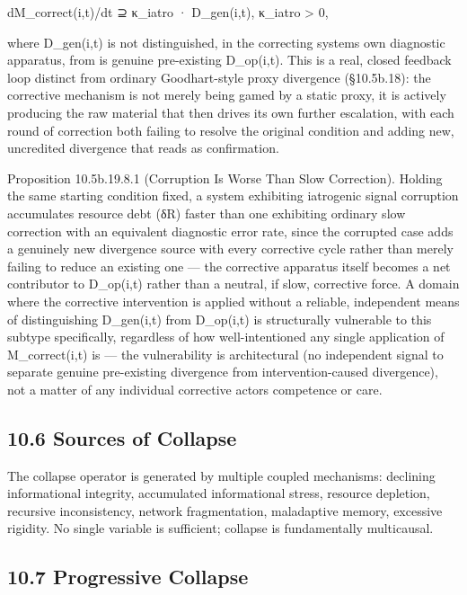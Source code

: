 \documentclass[
]{article}
\begin{document}
dM\_correct(i,t)/dt ⊇ κ\_iatro · D\_gen(i,t), κ\_iatro \textgreater{} 0,

where D\_gen(i,t) is not distinguished, in the correcting systems own
diagnostic apparatus, from is genuine pre-existing D\_op(i,t). This is a
real, closed feedback loop distinct from ordinary Goodhart-style proxy
divergence (§10.5b.18): the corrective mechanism is not merely being
gamed by a static proxy, it is actively producing the raw material that
then drives its own further escalation, with each round of correction
both failing to resolve the original condition and adding new,
uncredited divergence that reads as confirmation.

Proposition 10.5b.19.8.1 (Corruption Is Worse Than Slow Correction).
Holding the same starting condition fixed, a system exhibiting
iatrogenic signal corruption accumulates resource debt (δR) faster than
one exhibiting ordinary slow correction with an equivalent diagnostic
error rate, since the corrupted case adds a genuinely new divergence
source with every corrective cycle rather than merely failing to reduce
an existing one --- the corrective apparatus itself becomes a net
contributor to D\_op(i,t) rather than a neutral, if slow, corrective
force. A domain where the corrective intervention is applied without a
reliable, independent means of distinguishing D\_gen(i,t) from
D\_op(i,t) is structurally vulnerable to this subtype specifically,
regardless of how well-intentioned any single application of
M\_correct(i,t) is --- the vulnerability is architectural (no
independent signal to separate genuine pre-existing divergence from
intervention-caused divergence), not a matter of any individual
corrective actors competence or care.

\hypertarget{sources-of-collapse}{%
\subsection{10.6 Sources of Collapse}\label{sources-of-collapse}}

The collapse operator is generated by multiple coupled mechanisms:
declining informational integrity, accumulated informational stress,
resource depletion, recursive inconsistency, network fragmentation,
maladaptive memory, excessive rigidity. No single variable is
sufficient; collapse is fundamentally multicausal.

\hypertarget{progressive-collapse}{%
\subsection{10.7 Progressive Collapse}\label{progressive-collapse}}
\end{document}
